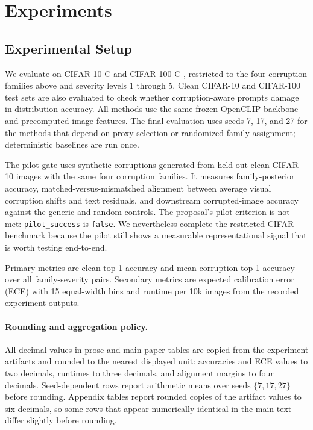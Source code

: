 \documentclass{article}
\begin{document}
\section{Experiments}
\label{sec:experiments}

\subsection{Experimental Setup}

We evaluate on CIFAR-10-C and CIFAR-100-C \citep{hendrycks2019benchmarking}, restricted to the four corruption families above and severity levels 1 through 5. Clean CIFAR-10 and CIFAR-100 test sets are also evaluated to check whether corruption-aware prompts damage in-distribution accuracy. All methods use the same frozen OpenCLIP backbone and precomputed image features. The final evaluation uses seeds 7, 17, and 27 for the methods that depend on proxy selection or randomized family assignment; deterministic baselines are run once.

The pilot gate uses synthetic corruptions generated from held-out clean CIFAR-10 images with the same four corruption families. It measures family-posterior accuracy, matched-versus-mismatched alignment between average visual corruption shifts and text residuals, and downstream corrupted-image accuracy against the generic and random controls. The proposal's pilot criterion is not met: \texttt{pilot\_success} is \texttt{false}. We nevertheless complete the restricted CIFAR benchmark because the pilot still shows a measurable representational signal that is worth testing end-to-end.

Primary metrics are clean top-1 accuracy and mean corruption top-1 accuracy over all family-severity pairs. Secondary metrics are expected calibration error (ECE) with 15 equal-width bins and runtime per 10k images from the recorded experiment outputs.

\paragraph{Rounding and aggregation policy.}
All decimal values in prose and main-paper tables are copied from the experiment artifacts and rounded to the nearest displayed unit: accuracies and ECE values to two decimals, runtimes to three decimals, and alignment margins to four decimals. Seed-dependent rows report arithmetic means over seeds $\{7,17,27\}$ before rounding. Appendix tables report rounded copies of the artifact values to six decimals, so some rows that appear numerically identical in the main text differ slightly before rounding.
\end{document}
